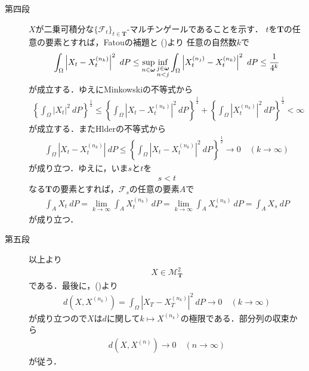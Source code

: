 \begin{sketch}
\begin{description}
			\item[第四段]
				$X$が二乗可積分な$\{\mathscr{F}_t\}_{t \in \mathbf{T}}$-マルチンゲールであることを示す．
				$t$を$\mathbf{T}$の任意の要素とすれば，Fatouの補題と
				()より
				任意の自然数$k$で
				\begin{align}
					\int_\Omega \left|X_t-X_t^{(n_k)}\right|^2\ dP
					\leq \sup{n \in \Natural}{\inf{\substack{j \in \Natural \\ n < j}}{
					\int_\Omega \left|X_t^{(n_j)}-X_t^{(n_k)}\right|^2\ dP}}
					\leq \frac{1}{4^k}
					\label{fom:thm_pseudo_metric_on_square_integrable_martingales_3}
 				\end{align}
 				が成立する．ゆえにMinkowskiの不等式から
 				\begin{align}
 					\left\{\int_\Omega |X_t|^2\ dP\right\}^{\frac{1}{2}}
 					\leq \left\{\int_\Omega \left|X_t - X^{(n_k)}_t\right|^2\ dP\right\}^{\frac{1}{2}}
 					+ \left\{\int_\Omega \left|X^{(n_k)}_t\right|^2\ dP\right\}^{\frac{1}{2}}
 					< \infty
 				\end{align}
 				が成立する．またHlderの不等式から
 				\begin{align}
 					\int_\Omega \left|X_t-X_t^{(n_k)}\right|\ dP
 					\leq \left\{\int_\Omega \left|X_t - X^{(n_k)}_t\right|^2\ dP\right\}^{\frac{1}{2}}
 					\longrightarrow 0\quad (k \longrightarrow \infty)
 				\end{align}
 				が成り立つ．ゆえに，いま$s$と$t$を
 				\begin{align}
 					s < t
 				\end{align}
 				なる$\mathbf{T}$の要素とすれば，$\mathscr{F}_s$の任意の要素$A$で
 				\begin{align}
 					\int_A X_t\ dP = \lim_{k \to \infty} \int_A X^{(n_k)}_t\ dP
 					= \lim_{k \to \infty} \int_A X^{(n_k)}_s\ dP
 					= \int_A X_s\ dP
 				\end{align}
 				が成り立つ．
 			
 			\item[第五段]
 				以上より
 				\begin{align}
 					X \in \mathscr{M}^2_{\mathbf{T}}
 				\end{align}
 				である．最後に，()より
 				\begin{align}
 					d\left(X,X^{(n_k)}\right) = \int_\Omega \left|X_T-X_T^{(n_k)}\right|^2\ dP
 					\longrightarrow 0\quad (k \longrightarrow \infty)
 				\end{align}
 				が成り立つので$X$は$d$に関して$k \longmapsto X^{(n_k)}$の極限である．部分列の収束から
 				\begin{align}
 					d\left(X,X^{(n)}\right) \longrightarrow 0\quad (n \longrightarrow \infty)
 				\end{align}
 				が従う．
 				\QED
		\end{description}
	\end{sketch}
	
